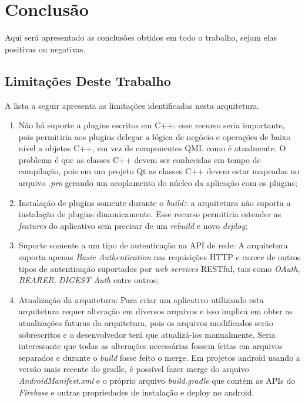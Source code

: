 \section{Conclusão}\label{sec:conclusao}
Aqui será apresentado as conclusões obtidos em todo o trabalho, sejam elas positivas ou negativas.


\subsection{Limitações Deste Trabalho}
A lista a seguir apresenta as limitações identificadas nesta arquitetura.

\begin{enumerate}
	\item Não há suporte a plugins escritos em C++: esse recurso seria importante, pois permitiria aos plugins delegar a lógica de negócio e operações de baixo nível a objetos C++, em vez de componentes QML como é atualmente. O problema é que as classes C++ devem ser conhecidas em tempo de compilação, pois em um projeto Qt as classes C++ devem estar mapeadas no arquivo \textit{.pro} gerando um acoplamento do núcleo da aplicação com os plugins;

	\item Instalação de plugins somente durante o \textit{build:}: a arquitetura não suporta a instalação de plugins dinamicamente. Esse recurso permitiria estender as \textit{features} do aplicativo sem precisar de um \textit{rebuild} e novo \textit{deploy};

	\item Suporte somente a um tipo de autenticação na API de rede: A arquitetura suporta apenas \textit{Basic Authentication} nas requisições HTTP e carece de outros tipos de autenticação suportados por \textit{web services} RESTful, tais como \textit{OAuth}, \textit{BEARER}, \textit{DIGEST Auth} entre outros;

	\item Atualização da arquitetura: Para criar um aplicativo utilizando esta arquitetura requer alteração em diversos arquivos e isso implica em obter as atualizações futuras da arquitetura, pois os arquivos modificados serão sobrescritos e o desenvolvedor terá que atualizá-los manualmente. Seria interessante que todas as alterações necessárias fossem feitas em arquivos separados e durante o \textit{build} fosse feito o merge. Em projetos android usando a versão mais recente do gradle, é possível fazer merge do arquivo \textit{AndroidManifest.xml} e o próprio arquivo \textit{build.gradle} que contém as APIs do \textit{Firebase} e outras propriedades de instalação e deploy no android.
\end{enumerate}


